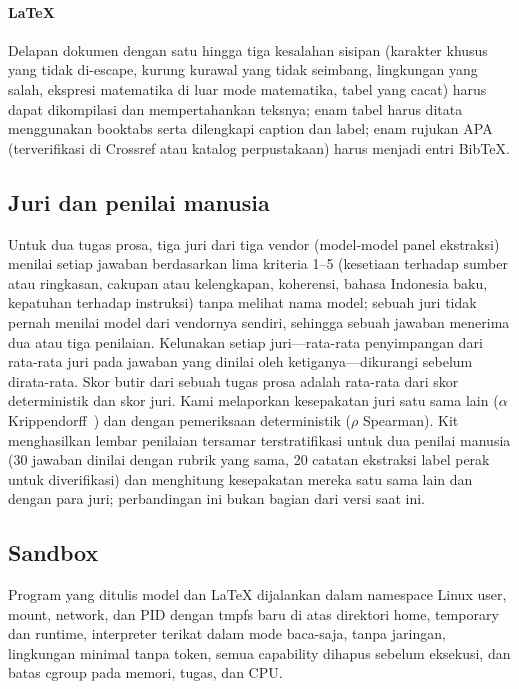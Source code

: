 \paragraph{LaTeX} Delapan dokumen dengan satu hingga tiga kesalahan sisipan (karakter khusus yang tidak di-escape, kurung kurawal yang tidak seimbang, lingkungan yang salah, ekspresi matematika di luar mode matematika, tabel yang cacat) harus dapat dikompilasi dan mempertahankan teksnya; enam tabel harus ditata menggunakan booktabs serta dilengkapi caption dan label; enam rujukan APA (terverifikasi di Crossref atau katalog perpustakaan) harus menjadi entri BibTeX.

\subsection{Juri dan penilai manusia}
Untuk dua tugas prosa, tiga juri dari tiga vendor (model-model panel ekstraksi) menilai setiap jawaban berdasarkan lima kriteria 1--5 (kesetiaan terhadap sumber atau ringkasan, cakupan atau kelengkapan, koherensi, bahasa Indonesia baku, kepatuhan terhadap instruksi) tanpa melihat nama model; sebuah juri tidak pernah menilai model dari vendornya sendiri, sehingga sebuah jawaban menerima dua atau tiga penilaian. Kelunakan setiap juri---rata-rata penyimpangan dari rata-rata juri pada jawaban yang dinilai oleh ketiganya---dikurangi sebelum dirata-rata. Skor butir dari sebuah tugas prosa adalah rata-rata dari skor deterministik dan skor juri. Kami melaporkan kesepakatan juri satu sama lain ($\alpha$ Krippendorff~\cite{hayes2007alpha}) dan dengan pemeriksaan deterministik ($\rho$ Spearman). Kit menghasilkan lembar penilaian tersamar terstratifikasi untuk dua penilai manusia (30 jawaban dinilai dengan rubrik yang sama, 20 catatan ekstraksi label perak untuk diverifikasi) dan menghitung kesepakatan mereka satu sama lain dan dengan para juri; perbandingan ini bukan bagian dari versi saat ini.

\subsection{Sandbox}
Program yang ditulis model dan LaTeX dijalankan dalam namespace Linux user, mount, network, dan PID dengan tmpfs baru di atas direktori home, temporary dan runtime, interpreter terikat dalam mode baca-saja, tanpa jaringan, lingkungan minimal tanpa token, semua capability dihapus sebelum eksekusi, dan batas cgroup pada memori, tugas, dan CPU.
